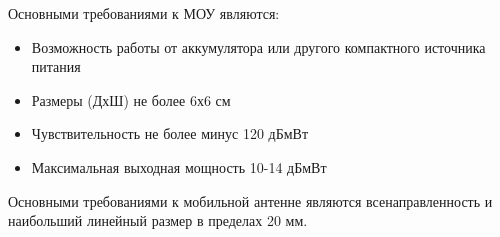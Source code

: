 Основными требованиями к МОУ являются:

\begin{itemize}
	\setlength\itemsep{-1ex}
	\item Возможность работы от аккумулятора или другого компактного источника питания
	\item Размеры (ДхШ) не более 6х6 см
	\item Чувствительность не более минус 120 дБмВт
	\item Максимальная выходная мощность 10-14 дБмВт
\end{itemize}

Основными требованиями к мобильной антенне являются всенаправленность и наибольший линейный размер в пределах 20 мм.


